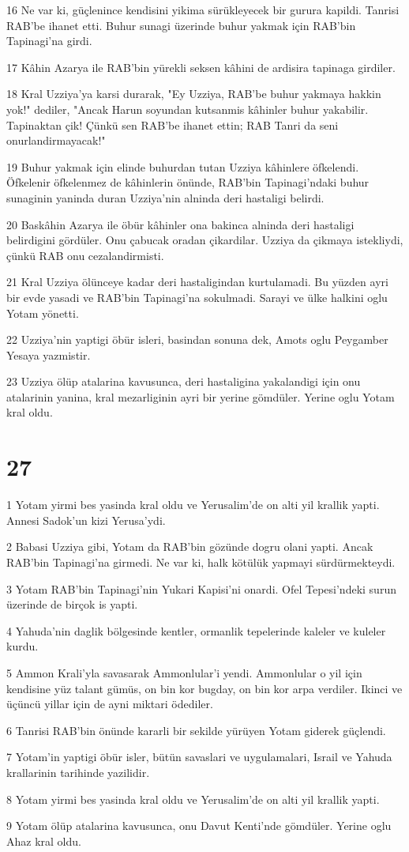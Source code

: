 \par 16 Ne var ki, güçlenince kendisini yikima sürükleyecek bir gurura kapildi. Tanrisi RAB'be ihanet etti. Buhur sunagi üzerinde buhur yakmak için RAB'bin Tapinagi'na girdi.
\par 17 Kâhin Azarya ile RAB'bin yürekli seksen kâhini de ardisira tapinaga girdiler.
\par 18 Kral Uzziya'ya karsi durarak, "Ey Uzziya, RAB'be buhur yakmaya hakkin yok!" dediler, "Ancak Harun soyundan kutsanmis kâhinler buhur yakabilir. Tapinaktan çik! Çünkü sen RAB'be ihanet ettin; RAB Tanri da seni onurlandirmayacak!"
\par 19 Buhur yakmak için elinde buhurdan tutan Uzziya kâhinlere öfkelendi. Öfkelenir öfkelenmez de kâhinlerin önünde, RAB'bin Tapinagi'ndaki buhur sunaginin yaninda duran Uzziya'nin alninda deri hastaligi belirdi.
\par 20 Baskâhin Azarya ile öbür kâhinler ona bakinca alninda deri hastaligi belirdigini gördüler. Onu çabucak oradan çikardilar. Uzziya da çikmaya istekliydi, çünkü RAB onu cezalandirmisti.
\par 21 Kral Uzziya ölünceye kadar deri hastaligindan kurtulamadi. Bu yüzden ayri bir evde yasadi ve RAB'bin Tapinagi'na sokulmadi. Sarayi ve ülke halkini oglu Yotam yönetti.
\par 22 Uzziya'nin yaptigi öbür isleri, basindan sonuna dek, Amots oglu Peygamber Yesaya yazmistir.
\par 23 Uzziya ölüp atalarina kavusunca, deri hastaligina yakalandigi için onu atalarinin yanina, kral mezarliginin ayri bir yerine gömdüler. Yerine oglu Yotam kral oldu.

\chapter{27}

\par 1 Yotam yirmi bes yasinda kral oldu ve Yerusalim'de on alti yil krallik yapti. Annesi Sadok'un kizi Yerusa'ydi.
\par 2 Babasi Uzziya gibi, Yotam da RAB'bin gözünde dogru olani yapti. Ancak RAB'bin Tapinagi'na girmedi. Ne var ki, halk kötülük yapmayi sürdürmekteydi.
\par 3 Yotam RAB'bin Tapinagi'nin Yukari Kapisi'ni onardi. Ofel Tepesi'ndeki surun üzerinde de birçok is yapti.
\par 4 Yahuda'nin daglik bölgesinde kentler, ormanlik tepelerinde kaleler ve kuleler kurdu.
\par 5 Ammon Krali'yla savasarak Ammonlular'i yendi. Ammonlular o yil için kendisine yüz talant gümüs, on bin kor bugday, on bin kor arpa verdiler. Ikinci ve üçüncü yillar için de ayni miktari ödediler.
\par 6 Tanrisi RAB'bin önünde kararli bir sekilde yürüyen Yotam giderek güçlendi.
\par 7 Yotam'in yaptigi öbür isler, bütün savaslari ve uygulamalari, Israil ve Yahuda krallarinin tarihinde yazilidir.
\par 8 Yotam yirmi bes yasinda kral oldu ve Yerusalim'de on alti yil krallik yapti.
\par 9 Yotam ölüp atalarina kavusunca, onu Davut Kenti'nde gömdüler. Yerine oglu Ahaz kral oldu.

